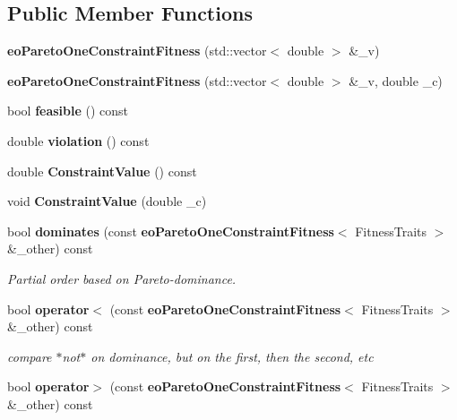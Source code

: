 \subsection*{Public Member Functions}
\begin{CompactItemize}
\item 
{\bf eo\-Pareto\-One\-Constraint\-Fitness} (std::vector$<$ double $>$ \&\_\-v)\label{classeo_pareto_one_constraint_fitness_a1}

\item 
{\bf eo\-Pareto\-One\-Constraint\-Fitness} (std::vector$<$ double $>$ \&\_\-v, double \_\-c)\label{classeo_pareto_one_constraint_fitness_a2}

\item 
bool {\bf feasible} () const \label{classeo_pareto_one_constraint_fitness_a3}

\item 
double {\bf violation} () const \label{classeo_pareto_one_constraint_fitness_a4}

\item 
double {\bf Constraint\-Value} () const \label{classeo_pareto_one_constraint_fitness_a5}

\item 
void {\bf Constraint\-Value} (double \_\-c)\label{classeo_pareto_one_constraint_fitness_a6}

\item 
bool {\bf dominates} (const {\bf eo\-Pareto\-One\-Constraint\-Fitness}$<$ Fitness\-Traits $>$ \&\_\-other) const \label{classeo_pareto_one_constraint_fitness_a7}

\begin{CompactList}\small\item\em Partial order based on Pareto-dominance. \item\end{CompactList}\item 
bool {\bf operator$<$} (const {\bf eo\-Pareto\-One\-Constraint\-Fitness}$<$ Fitness\-Traits $>$ \&\_\-other) const \label{classeo_pareto_one_constraint_fitness_a8}

\begin{CompactList}\small\item\em compare $\ast$not$\ast$ on dominance, but on the first, then the second, etc \item\end{CompactList}\item 
bool {\bf operator$>$} (const {\bf eo\-Pareto\-One\-Constraint\-Fitness}$<$ Fitness\-Traits $>$ \&\_\-other) const \label{classeo_pareto_one_constraint_fitness_a9}


\end{CompactItemize}
